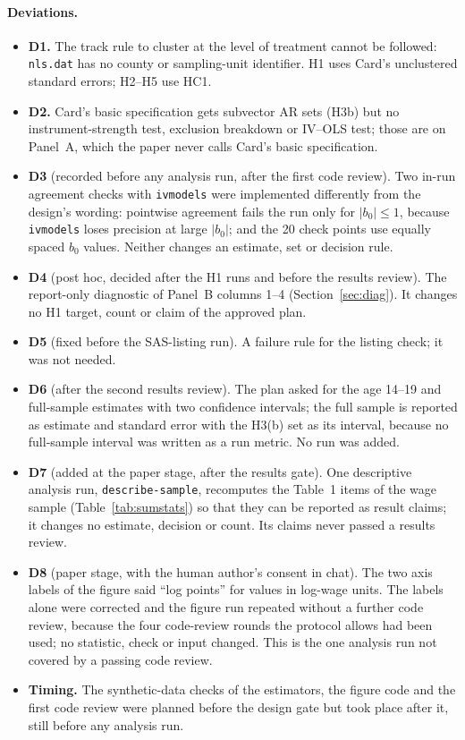 \documentclass[11pt]{article}
\newcommand{\var}[1]{\texttt{#1}}
\begin{document}
\paragraph{Deviations.}
\begin{itemize}
\item \textbf{D1.} The track rule to cluster at the level of treatment cannot be followed:
\var{nls.dat} has no county or sampling-unit identifier. H1 uses Card's unclustered
standard errors; H2--H5 use HC1.
\item \textbf{D2.} Card's basic specification gets subvector AR sets (H3b) but no
instrument-strength test, exclusion breakdown or IV--OLS test; those are on Panel~A, which
the paper never calls Card's basic specification.
\item \textbf{D3} (recorded before any analysis run, after the first code review). Two
in-run agreement checks with \var{ivmodels} were implemented differently from the design's
wording: pointwise agreement fails the run only for $|b_0| \le 1$, because \var{ivmodels}
loses precision at large $|b_0|$; and the 20 check points use equally spaced $b_0$ values.
Neither changes an estimate, set or decision rule.
\item \textbf{D4} (post hoc, decided after the H1 runs and before the results review). The
report-only diagnostic of Panel~B columns 1--4 (Section~\ref{sec:diag}). It changes no H1
target, count or claim of the approved plan.
\item \textbf{D5} (fixed before the SAS-listing run). A failure rule for the listing check;
it was not needed.
\item \textbf{D6} (after the second results review). The plan asked for the age 14--19 and
full-sample estimates with two confidence intervals; the full sample is reported as
estimate and standard error with the H3(b) set as its interval, because no full-sample
interval was written as a run metric. No run was added.
\item \textbf{D7} (added at the paper stage, after the results gate). One descriptive
analysis run, \var{describe-sample}, recomputes the Table~1 items of the wage sample
(Table~\ref{tab:sumstats}) so that they can be reported as result claims; it changes no
estimate, decision or count. Its claims never passed a results review.
\item \textbf{D8} (paper stage, with the human author's consent in chat). The two axis
labels of the figure said ``log points'' for values in log-wage units. The labels alone
were corrected and the figure run repeated without a further code review, because the four
code-review rounds the protocol allows had been used; no statistic, check or input changed.
This is the one analysis run not covered by a passing code review.
\item \textbf{Timing.} The synthetic-data checks of the estimators, the figure code and the
first code review were planned before the design gate but took place after it, still before
any analysis run.
\end{itemize}





\end{document}
